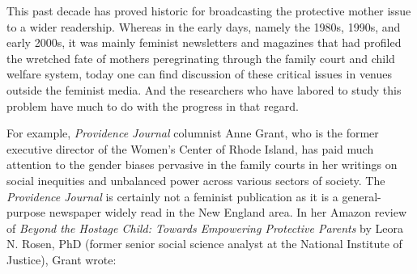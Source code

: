 \vspace{2em}


\noindent{}This past decade has proved historic for broadcasting the protective mother issue to a wider readership. Whereas in the early days,
namely the 1980s, 1990s, and early 2000s, it was mainly feminist newsletters and magazines that had profiled the wretched fate of mothers
peregrinating through the family court and child welfare system, today
one can find discussion of these critical issues in venues outside the feminist media. And the researchers who have labored to study this problem
have much to do with the progress in that regard. \pfl{}

For example, \textit{Providence Journal} columnist Anne Grant, who is the
former executive director of the Women's Center of Rhode Island, has
paid much attention to the gender biases pervasive in the family courts
in her writings on social inequities and unbalanced power across various sectors of society. The \textit{Providence Journal} is certainly not a feminist
publication as it is a general-purpose newspaper widely read in the New
England area. In her Amazon review of \textit{Beyond the
Hostage Child: Towards Empowering Protective Parents}
by Leora N. Rosen, PhD (former senior social science 
analyst at the National Institute of Justice), Grant wrote:

\vspace{-1em}

